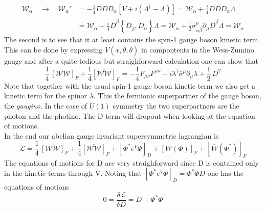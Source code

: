 \documentclass[12pt]{article}
\begin{document}
\begin{equation*}
  \begin{aligned}
      \mathcal{W}_{\alpha} \quad\to\quad \mathcal{W_\alpha}' &= -\frac{1}{4} \overline{D D} D_{\alpha}\left[V+i\left(\Lambda^{\dagger}-\Lambda\right)\right] =\mathcal{W}_{\alpha}+\frac{i}{4} \overline{D D} D_{\alpha} \Lambda \\
      &=\mathcal{W}_{\alpha}-\frac{i}{4} \bar{D}^{\dot{\beta}}\left\{\bar{D}_{\dot{\beta}}, D_{\alpha}\right\} \Lambda 
      =\mathcal{W}_{\alpha}+\frac{1}{2} \sigma_{\alpha \dot{\beta}}^{\mu} \partial_{\mu} \bar{D}^{\dot{\beta}} \Lambda
      =\mathcal{W}_{\alpha}
  \end{aligned}
\end{equation*}
The second is to see that it at least contains the spin-1 gauge boson kinetic term. This can be done by expressing $V(x, \theta, \bar\theta)$ in compontents in the Wess-Zumino gauge and after a quite tedious but straighforward calculation one can show that 
\begin{equation*}
  \frac{1}{4} \, \left[\mathcal{W}\mathcal{W}\right]_F + \frac{1}{4} \left[\overline{\mathcal{W}\mathcal{W}}\right]_F = -\frac{1}{4} F_{\mu\nu}F^{\mu\nu} + i \lambda^\dagger \bar\sigma^\mu \partial_\mu \lambda + \frac{1}{2} \, D^2
\end{equation*}
Note that together with the usual spin-1 gauge boson kinetic term we also get a kinetic term for the spinor $\lambda$. This the fermionic superpartner of the gauge boson, the \emph{gaugino}. In the case of $U(1)$ symmetry the two superpartners are the photon and the photino.
The D term will dropout when looking at the equation of motions. \\
In the end our abelian gauge invariant supersymmetric lagrangian is 
\begin{equation*}
  \mathcal{L} = \frac{1}{4} \, \left[\mathcal{W}\mathcal{W}\right]_F + \frac{1}{4} \left[\overline{\mathcal{W}\mathcal{W}}\right]_F + \left[\Phi^* e^V \Phi\right]_D + [W(\Phi)]_F + [\overline{W} (\Phi^*)]_F
\end{equation*}
The equations of motions for D are very straighforward since D is contained only in the kinetic terms through V. Noting that $[\Phi^* e^V \Phi]_D = \Phi^* \Phi D$ one has the equations of motions 
\begin{equation*}
  0 = \frac{\delta \mathcal{L}}{ \delta D} = D + \Phi^* \Phi
\end{equation*}
\par
\vspace{15pt}
\end{document}
